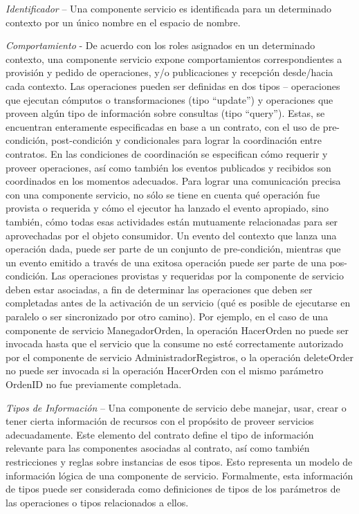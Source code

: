\documentclass{llncs}
\begin{document}
\textit{Identificador} – Una componente servicio es identificada para un determinado contexto por un único nombre en el espacio de nombre.

\textit{Comportamiento} -  De acuerdo con los roles asignados en un determinado contexto, una componente servicio expone comportamientos correspondientes a provisión y pedido de operaciones, y/o publicaciones y recepción  desde/hacia cada contexto. Las operaciones pueden ser definidas en dos tipos – operaciones que ejecutan cómputos o transformaciones (tipo “update”) y operaciones que proveen algún tipo de información sobre consultas  (tipo “query”). Estas, se encuentran enteramente especificadas en base a  un contrato, con el uso de pre-condición, post-condición y condicionales para lograr la coordinación entre contratos. En las condiciones de coordinación se especifican cómo requerir y proveer operaciones, así como también los eventos publicados  y recibidos son coordinados en los momentos adecuados. Para lograr una comunicación precisa con una componente servicio, no sólo se tiene en cuenta qué operación fue provista o requerida y cómo el ejecutor ha lanzado el evento apropiado, sino también, cómo todas esas actividades están mutuamente relacionadas para ser aprovechadas por el objeto consumidor. Un evento del contexto que lanza una operación dada, puede ser parte de un conjunto de pre-condición, mientras que un evento emitido a través de una exitosa operación puede ser parte de una pos-condición. 
Las operaciones provistas y requeridas por la componente de servicio deben estar asociadas, a fin de determinar las operaciones que deben ser completadas antes de la activación de un servicio (qué es posible de ejecutarse en paralelo o ser sincronizado por otro camino). Por ejemplo, en el caso de una componente de servicio ManegadorOrden, la operación HacerOrden no puede ser invocada hasta que el servicio que la consume no esté correctamente autorizado por el componente de servicio AdministradorRegistros, o la operación deleteOrder no puede ser invocada si la operación HacerOrden con el mismo parámetro OrdenID no fue previamente completada.

\textit{Tipos de Información} –  Una componente de servicio debe  manejar, usar,  crear o tener cierta información de recursos con el propósito de proveer servicios adecuadamente.  Este elemento del contrato define el tipo de información relevante para las componentes  asociadas al contrato, así como también restricciones y reglas sobre instancias de esos tipos. Esto representa un modelo de información lógica de una componente de servicio. Formalmente, esta información de tipos puede ser considerada como definiciones de tipos de  los parámetros de las operaciones o tipos relacionados a ellos.
\end{document}
